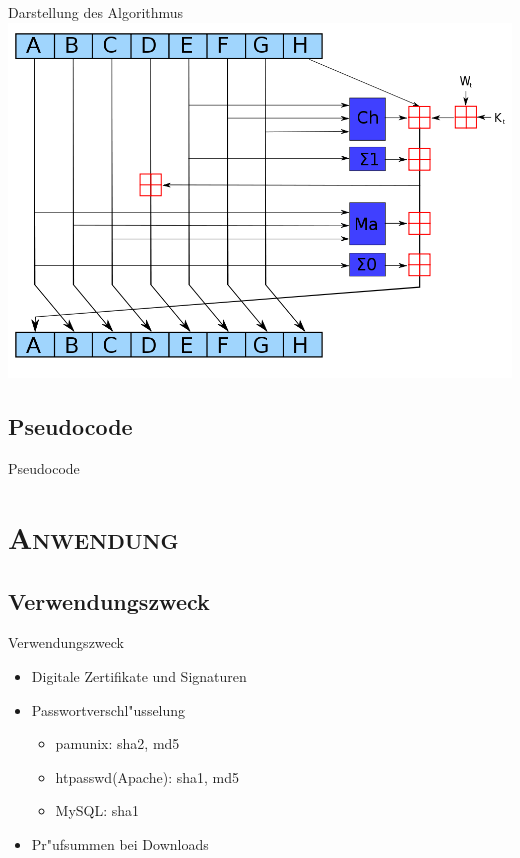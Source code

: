 \documentclass[xcolor=x11names,compress]{beamer}
\renewcommand{\(}{\begin{columns}}
\renewcommand{\)}{\end{columns}}
\newcommand{\<}[1]{\begin{column}{#1}}
\renewcommand{\>}{\end{column}}
\begin{document}
\begin{frame}{Darstellung des Algorithmus}
\includegraphics[scale=0.3]{sha256.png}\\
\end{frame}


\subsection{Pseudocode}
\begin{frame}{Pseudocode}

\end{frame}


\section{\scshape Anwendung}
\subsection{Verwendungszweck}
\begin{frame}{Verwendungszweck}

\begin{itemize}
\item Digitale Zertifikate und Signaturen 
	\pause
\item Passwortverschl"usselung
\begin{itemize}
	\item pam\textunderscore unix: sha2, md5
	\item htpasswd(Apache): sha1, md5
	\item MySQL: sha1
\end{itemize}
\pause
\item Pr"ufsummen bei Downloads
\end{itemize}


\end{frame}
\end{document}
